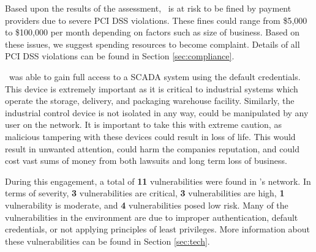     Based upon the results of the assessment, \cptc\ is at risk to be fined by payment providers due to severe PCI DSS violations. These fines could range from \$5,000 to \$100,000 per month depending on factors such as size of business. Based on these issues, we suggest spending resources to become complaint. Details of all PCI DSS violations can be found in Section \ref{sec:compliance}. 
    
    \teamname\ was able to gain full access to a SCADA system using the default credentials. This device is extremely important as it is critical to industrial systems which operate the storage, delivery, and packaging warehouse facility. Similarly, the industrial control device is not isolated in any way, could be manipulated by any user on the network. It is important to take this with extreme caution, as malicious tampering with these devices could result in loss of life. This would result in unwanted attention, could harm the companies reputation, and could cost \cptc vast sums of money from both lawsuits and long term loss of business.
    
    During this engagement, a total of \textbf{11} vulnerabilities were found in \cptc's network. In terms of severity, \textbf{3} vulnerabilities are critical, \textbf{3} vulnerabilities are high, \textbf{1} vulnerability is moderate, and \textbf{4} vulnerabilities posed low risk. Many of the vulnerabilities in the environment are due to improper authentication, default credentials, or not applying principles of least privileges. More information about these vulnerabilities can be found in Section \ref{sec:tech}.